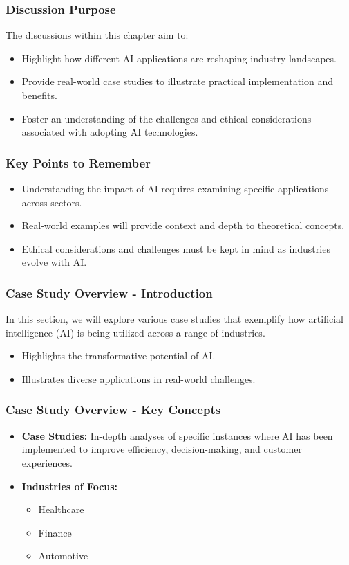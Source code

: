 \documentclass{beamer}
\begin{document}
\begin{frame}[fragile]
    \frametitle{Discussion Purpose}
    The discussions within this chapter aim to:
    \begin{itemize}
        \item Highlight how different AI applications are reshaping industry landscapes.
        \item Provide real-world case studies to illustrate practical implementation and benefits.
        \item Foster an understanding of the challenges and ethical considerations associated with adopting AI technologies.
    \end{itemize}
\end{frame}

\begin{frame}[fragile]
    \frametitle{Key Points to Remember}
    \begin{itemize}
        \item Understanding the impact of AI requires examining specific applications across sectors.
        \item Real-world examples will provide context and depth to theoretical concepts.
        \item Ethical considerations and challenges must be kept in mind as industries evolve with AI.
    \end{itemize}
\end{frame}

\begin{frame}[fragile]
    \frametitle{Case Study Overview - Introduction}
    In this section, we will explore various case studies that exemplify how artificial intelligence (AI) is being utilized across a range of industries. 

    \begin{itemize}
        \item Highlights the transformative potential of AI.
        \item Illustrates diverse applications in real-world challenges.
    \end{itemize}
\end{frame}

\begin{frame}[fragile]
    \frametitle{Case Study Overview - Key Concepts}
    \begin{itemize}
        \item \textbf{Case Studies:} In-depth analyses of specific instances where AI has been implemented to improve efficiency, decision-making, and customer experiences.
        \item \textbf{Industries of Focus:} 
        \begin{itemize}
            \item Healthcare
            \item Finance
            \item Automotive
        \end{itemize}
    \end{itemize}
\end{frame}
\end{document}
